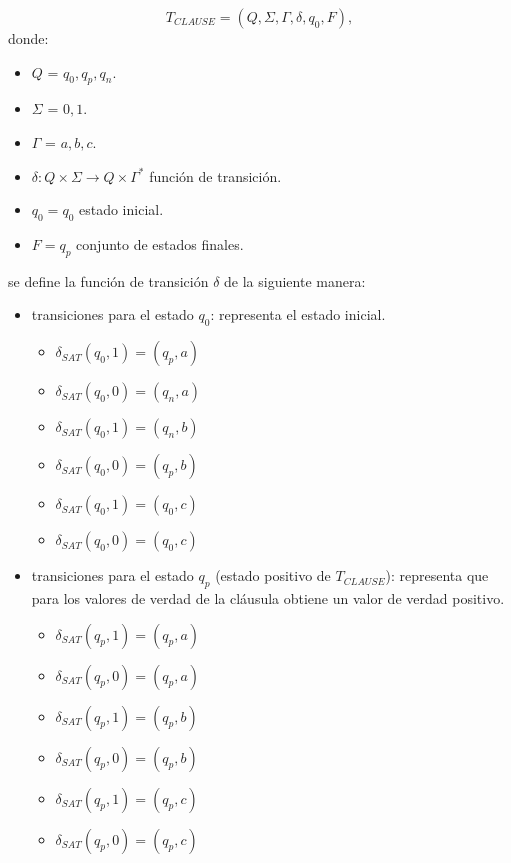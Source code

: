 \documentclass{article}
\begin{document}
\[
    T_{CLAUSE} = (Q, {\Sigma}, \Gamma, \delta, q_{0}, F),
\]
donde:
\begin{itemize}
    \item \(Q\) = ${q_0,q_p,q_n}$.
    \item \(\Sigma\) = ${0,1}$.
    \item \(\Gamma\) = ${a,b,c}$.
    \item \(\delta: Q \times \Sigma \to Q \times \Gamma^*\) función de transición.
    \item \(q_{0} = q_0\) estado inicial.
    \item \(F={q_p}\) conjunto de estados finales.
\end{itemize}
se define la función de transición $\delta$ de la siguiente manera:

\begin{itemize}
    \item  transiciones para el estado $q_0$: representa el estado inicial.
          \begin{multicols}{2}
              \begin{itemize}
                  \item $\delta_{SAT}(q_0,1)=(q_p,a)$
                  \item $\delta_{SAT}(q_0,0)=(q_n,a)$
                  \item $\delta_{SAT}(q_0,1)=(q_n,b)$
                  \item $\delta_{SAT}(q_0,0)=(q_p,b)$
                  \item $\delta_{SAT}(q_0,1)=(q_0,c)$
                  \item $\delta_{SAT}(q_0,0)=(q_0,c)$
              \end{itemize}
          \end{multicols}
          
    \item  transiciones para el estado $q_p$ (estado positivo de $T_{CLAUSE}$): representa que para los valores de verdad de la cláusula obtiene un valor de verdad positivo.
          \begin{multicols}{2}
              \begin{itemize}
                  \item $\delta_{SAT}(q_{p},1)=(q_{p},a)$
                  \item $\delta_{SAT}(q_{p},0)=(q_{p},a)$
                  \item $\delta_{SAT}(q_{p},1)=(q_{p},b)$
                  \item $\delta_{SAT}(q_{p},0)=(q_{p},b)$
                  \item $\delta_{SAT}(q_{p},1)=(q_{p},c)$
                  \item $\delta_{SAT}(q_{p},0)=(q_{p},c)$
              \end{itemize}
          \end{multicols}
          

\end{itemize}
\end{document}
